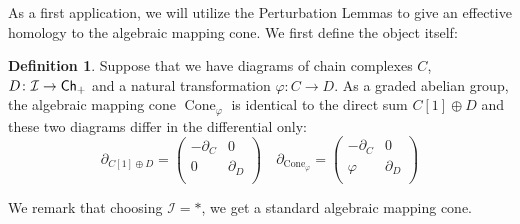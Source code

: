 \documentclass[12pt,a4wide]{article}
\theoremstyle{plain}
\theoremstyle{definition}
\newtheorem{Def}[thm]{Definition}
\renewcommand\:{\colon}
\def\bo{\partial} %
\newcommand{\dC}{{C}}
\newcommand{\dD}{D}
\newcommand{\icat}{\mathcal I}
\DeclareMathOperator\dCone{{Cone}}
\begin{document}
 
As a first application, we will utilize the Perturbation Lemmas to give an effective homology to the algebraic mapping cone. We first define the object itself:
\begin{Def} 
Suppose that we have diagrams  of chain complexes $\dC$, $\dD \:\icat \to \Ch_+$ and a natural transformation $\varphi\: \dC \to \dD$. As a graded abelian group, the algebraic mapping cone $\dCone_\varphi$ is identical to the direct sum $\dC[1] \oplus \dD$ and these two diagrams differ in the differential only:
\[
\bo_{\dC[1] \oplus \dD} = 
\begin{pmatrix}
-\bo_{\dC} & 0\\
0 & \bo_{\dD}\\
\end{pmatrix}
\quad
\bo_{\dCone_\varphi} = 
\begin{pmatrix}
- \bo_{\dC} & 0 \\
\varphi & \bo_{\dD}\\
\end{pmatrix}
\]
\end{Def} 
We remark that choosing $\icat = *$, we get a standard algebraic mapping cone.
\end{document}
